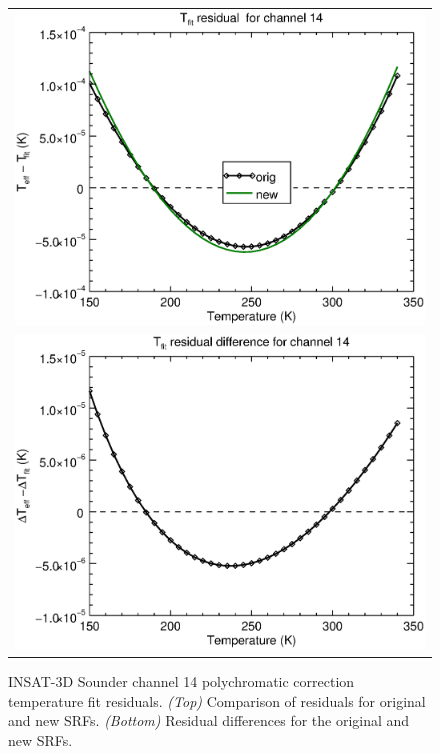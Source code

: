 \begin{figure}[H]
  \centering
  \begin{tabular}{c}
    \includegraphics[scale=0.55]{graphics/sndr/tfit/sndr_insat3d-14.tfit.eps} \\
    \includegraphics[scale=0.55]{graphics/sndr/tfit/sndr_insat3d-14.tfit.difference.eps}
  \end{tabular}
  \caption{INSAT-3D Sounder channel 14 polychromatic correction temperature fit residuals. \emph{(Top)} Comparison of residuals for original and new SRFs. \emph{(Bottom)} Residual differences for the original and new SRFs.}
  \label{fig:sndr_ch14_tfit}
\end{figure}


